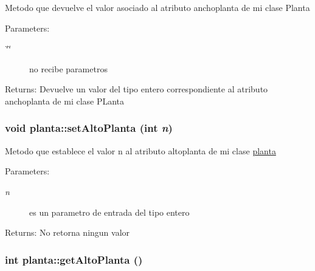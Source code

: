Metodo que devuelve el valor asociado al atributo anchoplanta de mi clase Planta \begin{Desc}
\item[Parameters:]
\begin{description}
\item[{\em \char`\"{}\char`\"{}}]no recibe parametros \end{description}
\end{Desc}
\begin{Desc}
\item[Returns:]Devuelve un valor del tipo entero correspondiente al atributo anchoplanta de mi clase PLanta \end{Desc}
\hypertarget{classplanta_935647ba7aa07152ac9a4a5bf0ec92fd}{
\subsubsection[setAltoPlanta]{\setlength{\rightskip}{0pt plus 5cm}void planta::setAltoPlanta (int {\em n})}}
\label{classplanta_935647ba7aa07152ac9a4a5bf0ec92fd}


Metodo que establece el valor n al atributo altoplanta de mi clase \hyperlink{classplanta}{planta} \begin{Desc}
\item[Parameters:]
\begin{description}
\item[{\em n}]es un parametro de entrada del tipo entero \end{description}
\end{Desc}
\begin{Desc}
\item[Returns:]No retorna ningun valor \end{Desc}
\hypertarget{classplanta_3d9fad702134aa5718b9d00ae11d7646}{
\subsubsection[getAltoPlanta]{\setlength{\rightskip}{0pt plus 5cm}int planta::getAltoPlanta ()}}
\label{classplanta_3d9fad702134aa5718b9d00ae11d7646}


